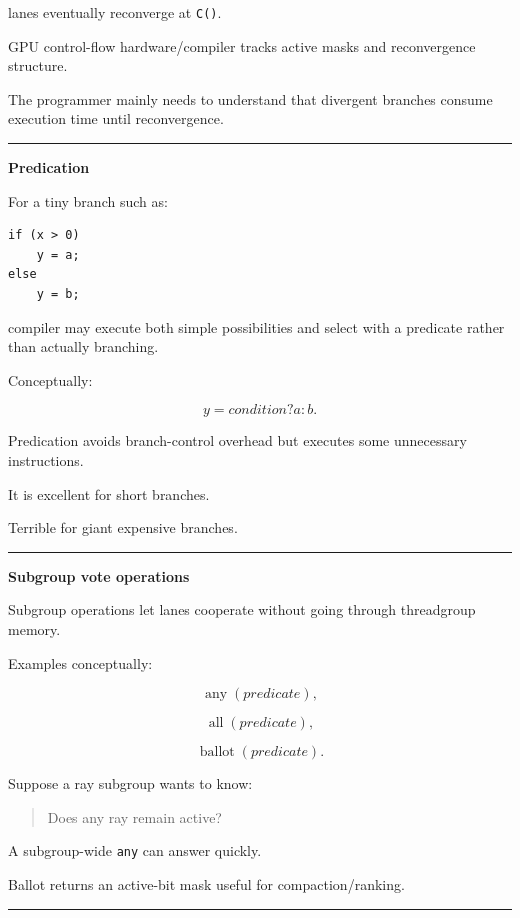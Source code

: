 lanes eventually reconverge at \texttt{C()}.

GPU control-flow hardware/compiler tracks active masks and reconvergence structure.

The programmer mainly needs to understand that divergent branches consume execution time until reconvergence.

\begin{center}\rule{0.5\linewidth}{0.5pt}\end{center}

\textbf{Predication}

For a tiny branch such as:

\protect{}\label{whgcgz}%
\begin{verbatim}
if (x > 0)
    y = a;
else
    y = b;
\end{verbatim}

compiler may execute both simple possibilities and select with a predicate rather than actually branching.

Conceptually:

\[
y=
condition?a:b.
\]

Predication avoids branch-control overhead but executes some unnecessary instructions.

It is excellent for short branches.

Terrible for giant expensive branches.

\begin{center}\rule{0.5\linewidth}{0.5pt}\end{center}

\textbf{Subgroup vote operations}

Subgroup operations let lanes cooperate without going through threadgroup memory.

Examples conceptually:

\[
\operatorname{any}(predicate),
\]

\[
\operatorname{all}(predicate),
\]

\[
\operatorname{ballot}(predicate).
\]

Suppose a ray subgroup wants to know:

\begin{quote}
Does any ray remain active?
\end{quote}

A subgroup-wide \texttt{any} can answer quickly.

Ballot returns an active-bit mask useful for compaction/ranking.

\begin{center}\rule{0.5\linewidth}{0.5pt}\end{center}

